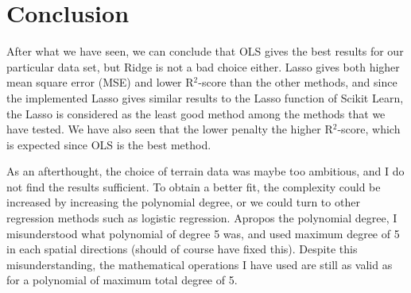 \section{Conclusion} \label{sec:conclusion}
After what we have seen, we can conclude that OLS gives the best results for our particular data set, but Ridge is not a bad choice either. Lasso gives both higher mean square error (MSE) and lower R$^2$-score than the other methods, and since the implemented Lasso gives similar results to the Lasso function of Scikit Learn, the Lasso is considered as the least good method among the methods that we have tested. We have also seen that the lower penalty the higher R$^2$-score, which is expected since OLS is the best method. 

As an afterthought, the choice of terrain data was maybe too ambitious, and I do not find the results sufficient. To obtain a better fit, the complexity could be increased by increasing the polynomial degree, or we could turn to other regression methods such as logistic regression. Apropos the polynomial degree, I misunderstood what polynomial of degree 5 was, and used maximum degree of 5 in each spatial directions (should of course have fixed this). Despite this misunderstanding, the mathematical operations I have used are still as valid as for a polynomial of maximum total degree of 5.